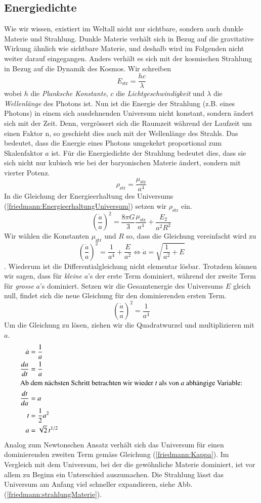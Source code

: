 \begin{refsection}
\subsection*{Energiedichte}
Wie wir wissen, existiert im Weltall nicht nur sichtbare, sondern auch dunkle Materie und Strahlung. Dunkle Materie verhält sich in Bezug auf die gravitative Wirkung ähnlich wie sichtbare Materie, und deshalb wird im Folgenden nicht weiter darauf eingegangen.
Anders verhält es sich mit der kosmischen Strahlung in Bezug auf die Dynamik des Kosmos. Wir schreiben
\[ E_\text{str} = \frac{h c}{\lambda} \]
wobei $h$ die {\em Planksche Konstante}, $c$ die {\em Lichtgeschwindigkeit} und $\lambda$ die {\em Wellenlänge} des Photons ist.
Nun ist die Energie der Strahlung (z.B. eines Photons) in einem sich ausdehnenden Universum nicht konstant, sondern ändert sich mit der Zeit. 
Denn, vergrössert sich die Raumzeit während der Laufzeit um einen Faktor n, so geschieht dies auch mit der Wellenlänge des Strahls. Das bedeutet, dass die Energie eines Photons umgekehrt proportional zum Skalenfaktor $a$ ist. Für die Energiedichte der Strahlung bedeutet dies, dass sie sich nicht nur kubisch wie bei der baryonischen Materie ändert, sondern mit vierter Potenz.
\begin{equation}
\rho_\text{str} = \frac{\mu_{\text{str}}}{a^4}
\end{equation}
In die Gleichung der Energieerhaltung des Universums (\ref{friedmann:EnergieerhaltungUniversum}) setzen wir $\rho_\text{str}$ ein.
\[\left(\frac{\dot{a}}{a} \right)^2 = \frac{8 \pi G}{3} \frac{\mu_{\text{str}}}{a^4} + \frac{E_2}{a^2 R^2}\]
Wir wählen die Konstanten $\mu_{\text{str}}$ und $R$ so, dass die Gleichung vereinfacht wird zu
\[\left(\frac{\dot{a}}{a} \right)^2 = \frac{1}{a^4} + \frac{E}{a^2} \Leftrightarrow \dot{a} = \sqrt{\frac{1}{a^2} + E}\].
Wiederum ist die Differentialgleichung nicht elementar lösbar. Trotzdem können wir sagen, dass für {\em kleine} $a$'s der erste Term dominiert, während der zweite Term für {\em grosse} $a$'s dominiert. Setzen wir die Gesamtenergie des Universums $E$ gleich null, findet sich die neue Gleichung für den dominierenden ersten Term.	
\[\left(\frac{\dot{a}}{a} \right)^2 = \frac{1}{a^4}\]
Um die Gleichung zu lösen, ziehen wir die Quadratwurzel und multiplizieren mit $a$.
\begin{align}
	\nonumber\dot{a} &= \frac{1}{a}\\
	\nonumber\frac{da}{dt} &=\frac{1}{a}\\
	\intertext{Ab dem nächsten Schritt betrachten wir wieder $t$ als von $a$ abhängige Variable:}
	\nonumber\frac{dt}{da} &= a\\
	\nonumber t &= \frac{1}{2} a^{2}\\
	a &= \sqrt{2}\,t^{1/2} 
\end{align}
Analog zum Newtonschen Ansatz verhält sich das Universum für einen dominierenden zweiten Term gemäss Gleichung (\ref{friedmann:Kappa}). 
Im Vergleich mit dem Universum, bei der die gewöhnliche Materie dominiert, ist vor allem zu Beginn ein Unterschied auszumachen. Die Strahlung lässt das Universum am Anfang viel schneller expandieren, siehe Abb. (\ref{friedmann:strahlungMaterie}). 


\end{refsection}

